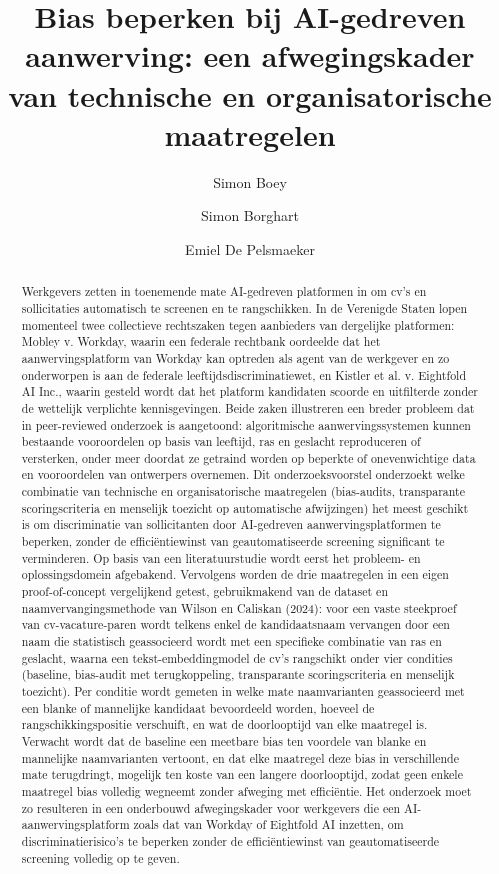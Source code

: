 \documentclass{hogent-article}
\title{Bias beperken bij AI-gedreven aanwerving: een afwegingskader van technische en organisatorische maatregelen}
\author{Simon Boey}
\author{Simon Borghart}
\author{Emiel De Pelsmaeker}
\begin{document}
\begin{abstract}
  Werkgevers zetten in toenemende mate AI-gedreven platformen in om cv's en
  sollicitaties automatisch te screenen en te rangschikken. In de Verenigde
  Staten lopen momenteel twee collectieve rechtszaken tegen aanbieders van
  dergelijke platformen: Mobley v. Workday, waarin een federale rechtbank
  oordeelde dat het aanwervingsplatform van Workday kan optreden als agent
  van de werkgever en zo onderworpen is aan de federale
  leeftijdsdiscriminatiewet, en Kistler et al. v. Eightfold AI Inc., waarin
  gesteld wordt dat het platform kandidaten scoorde en uitfilterde zonder de
  wettelijk verplichte kennisgevingen. Beide zaken illustreren een breder
  probleem dat in peer-reviewed onderzoek is aangetoond: algoritmische
  aanwervingssystemen kunnen bestaande vooroordelen op basis van leeftijd,
  ras en geslacht reproduceren of versterken, onder meer doordat ze getraind
  worden op beperkte of onevenwichtige data en vooroordelen van ontwerpers
  overnemen. Dit onderzoeksvoorstel onderzoekt welke combinatie van
  technische en organisatorische maatregelen (bias-audits, transparante
  scoringscriteria en menselijk toezicht op automatische afwijzingen) het
  meest geschikt is om discriminatie van sollicitanten door AI-gedreven
  aanwervingsplatformen te beperken, zonder de efficiëntiewinst van
  geautomatiseerde screening significant te verminderen. Op basis van een
  literatuurstudie wordt eerst het probleem- en oplossingsdomein afgebakend.
  Vervolgens worden de drie maatregelen in een eigen proof-of-concept
  vergelijkend getest, gebruikmakend van de dataset en naamvervangingsmethode
  van Wilson en Caliskan (2024): voor een vaste steekproef van
  cv-vacature-paren wordt telkens enkel de kandidaatsnaam vervangen door een
  naam die statistisch geassocieerd wordt met een specifieke combinatie van
  ras en geslacht, waarna een tekst-embeddingmodel de cv's rangschikt onder
  vier condities (baseline, bias-audit met terugkoppeling, transparante
  scoringscriteria en menselijk toezicht). Per conditie wordt gemeten in
  welke mate naamvarianten geassocieerd met een blanke of mannelijke
  kandidaat bevoordeeld worden, hoeveel de rangschikkingspositie verschuift,
  en wat de doorlooptijd van elke maatregel is. Verwacht wordt dat de
  baseline een meetbare bias ten voordele van blanke en mannelijke
  naamvarianten vertoont, en dat elke maatregel deze bias in verschillende
  mate terugdringt, mogelijk ten koste van een langere doorlooptijd, zodat
  geen enkele maatregel bias volledig wegneemt zonder afweging met
  efficiëntie. Het onderzoek moet zo resulteren in
  een onderbouwd afwegingskader voor werkgevers die een
  AI-aanwervingsplatform zoals dat van Workday of Eightfold AI inzetten, om
  discriminatierisico's te beperken zonder de efficiëntiewinst van
  geautomatiseerde screening volledig op te geven.
\end{abstract}
\end{document}
